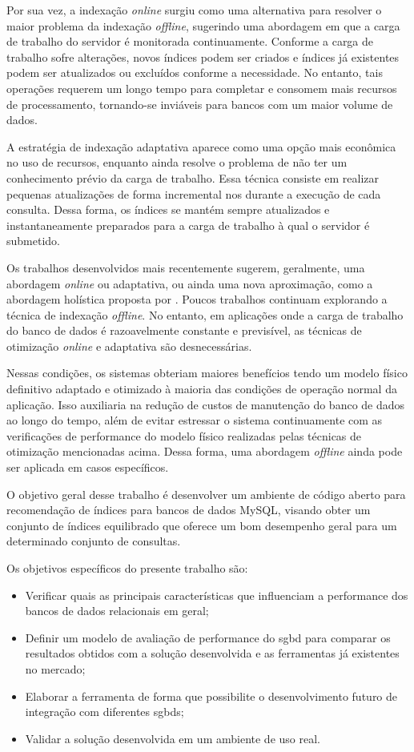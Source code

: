 Por sua vez, a indexação \emph{online} surgiu como uma alternativa para resolver o maior problema da indexação \emph{offline}, sugerindo uma abordagem em que a carga de trabalho do servidor é monitorada continuamente. Conforme a carga de trabalho sofre alterações, novos índices podem ser criados e índices já existentes podem ser atualizados ou excluídos conforme a necessidade. No entanto, tais operações requerem um longo tempo para completar e consomem mais recursos de processamento, tornando-se inviáveis para bancos com um maior volume de dados.

A estratégia de indexação adaptativa aparece como uma opção mais econômica no uso de recursos, enquanto ainda resolve o problema de não ter um conhecimento prévio da carga de trabalho. Essa técnica consiste em realizar pequenas atualizações de forma incremental nos durante a execução de cada consulta. Dessa forma, os índices se mantém sempre atualizados e instantaneamente preparados para a carga de trabalho à qual o servidor é submetido.

Os trabalhos desenvolvidos mais recentemente sugerem, geralmente, uma abordagem \emph{online} ou adaptativa, ou ainda uma nova aproximação, como a abordagem holística proposta por \citet{Petraki:2015}. Poucos trabalhos continuam explorando a técnica de indexação \emph{offline}. No entanto, em aplicações onde a carga de trabalho do banco de dados é razoavelmente constante e previsível, as técnicas de otimização \emph{online} e adaptativa são desnecessárias.

Nessas condições, os sistemas obteriam maiores benefícios tendo um modelo físico definitivo adaptado e otimizado à maioria das condições de operação normal da aplicação. Isso auxiliaria na redução de custos de manutenção do banco de dados ao longo do tempo, além de evitar estressar o sistema continuamente com as verificações de performance do modelo físico realizadas pelas técnicas de otimização mencionadas acima. Dessa forma, uma abordagem \emph{offline} ainda pode ser aplicada em casos específicos.

O objetivo geral desse trabalho é desenvolver um ambiente de código aberto para recomendação de índices para bancos de dados MySQL, visando obter um conjunto de índices equilibrado que oferece um bom desempenho geral para um determinado conjunto de consultas.

Os objetivos específicos do presente trabalho são:

\begin{itemize}
  \item Verificar quais as principais características que influenciam a performance dos bancos de dados relacionais em geral;
  \item Definir um modelo de avaliação de performance do \gls{sgbd} para comparar os resultados obtidos com a solução desenvolvida e as ferramentas já existentes no mercado;
  \item Elaborar a ferramenta de forma que possibilite o desenvolvimento futuro de integração com diferentes \glspl{sgbd};
  \item Validar a solução desenvolvida em um ambiente de uso real.
\end{itemize}

